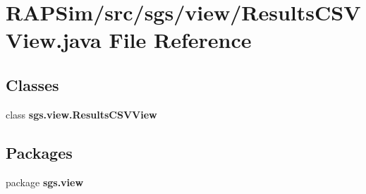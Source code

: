 \section{R\-A\-P\-Sim/src/sgs/view/\-Results\-C\-S\-V\-View.java File Reference}
\label{_results_c_s_v_view_8java}
\subsection*{Classes}
\begin{DoxyCompactItemize}
\item 
class {\bf sgs.\-view.\-Results\-C\-S\-V\-View}
\end{DoxyCompactItemize}
\subsection*{Packages}
\begin{DoxyCompactItemize}
\item 
package {\bf sgs.\-view}
\end{DoxyCompactItemize}
